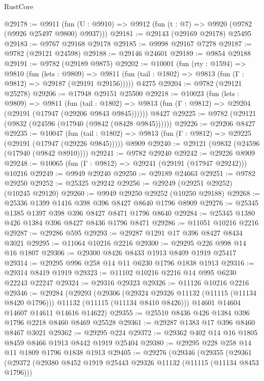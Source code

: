 \begin{lexlean}{RustCore}
\begin{coremodule}
@29178 := @9911
    (fun (U : @9910) => @9912 (fun (t : @7) => @9920 (@9782 (@9926 @25497 @9800) @9937)))
@29181 := @29143 (@29169 @29178) @25495
@29183 := @9767 @29168 @29178
@29185 := @9998 @29167 @7278
@29187 := @9782 (@29121 @24598)
@29188 := @29146 @24601
@29189 := @9854 @29188
@29191 := @9782 (@29189 @9875)
@29202 := @10001
    (fun (rty : @1594) =>
    @9810
      (fun (lets : @9809) =>
      @9811 (fun (tail : @1802) => @9813 (fun (Γ : @9812) => @29187 (@29191 @29156)))))
    @4275
@29204 := @9782 (@29121 @25278)
@29206 := @17948 @29151 @25500
@29218 := @10023
    (fun (lets : @9809) =>
    @9811
      (fun (tail : @1802) =>
      @9813 (fun (Γ : @9812) => @29204 (@29191 (@17947 (@29206 @9843 @9845))))))
    @8427
@29225 := @9782 (@29121 (@9832 (@24596 (@17940 (@9842 (@8428 @9845))))))
@29226 := @29206 @8427
@29235 := @10047
    (fun (tail : @1802) => @9813 (fun (Γ : @9812) => @29225 (@29191 (@17947 (@29226 @9845)))))
    @8909
@29240 := @29121 (@9832 (@24596 (@17940 (@9842 @8910))))
@29241 := @9782 @29240
@29242 := @29226 @8909
@29248 := @10065 (fun (Γ : @9812) => @29241 (@29191 (@17947 @29242))) @10216
@29249 := @9949 @29240
@29250 := @29189 @24663
@29251 := @9782 @29250
@29252 := @25325 @29242
@29256 := @29249 (@29251 @29252) (@10245 @29120)
@29260 := @9949 @29250 @29252 (@10250 @29188)
@29268 := @25336 @1399 @1416 @398 @396 @8427 @8640 @1796 @8909
@29276 := @25345 @1385 @1397 @398 @396 @8427 @8471 @1796 @8640
@29284 := @25345 @1380 @426 @1384 @396 @8427 @8436 @1796 @8471
@29286 := @11051 @10216 @2216
@29287 := @29286 @595
@29293 := @29287 @1291 @17 @396 @8427 @8434 @3021
@29295 := @11064 @10216 @2216
@29300 := @29295 @226 @998 @14 @16 @1807
@29306 := @29300 @8426 @8433 @1913 @8409 @1919 @25417
@29314 := @29295 @996 @258 @14 @11 @6230 @1796 @1838 @1913
@29316 := @29314 @8419 @1919
@29323 := @11102 @10216 @2216 @14 @995 @6230 @22243 @22247
@29324 := @29316 @29323
@29326 := @11126 @10216 @2216
@29346 := @29284
    (@29293
      (@29306
        (@29324 @29326 @11132 (@11115 (@11134 @8420 @1796)))
        @11132
        (@11115 (@11134 @8410 @8426)))
      @14601
      @14604
      @14607
      @14611
      @14616
      @14622)
@29355 := @25510 @8436 @426 @1384 @396 @1796 @2218 @8460 @8469 @25528
@29361 := @29287 @1383 @17 @396 @8460 @8467 @3021
@29362 := @29295 @224
@29372 := @29362 @402 @14 @16 @1805 @8459 @8466 @1913 @8442 @1919 @25404
@29380 := @29295 @228 @258 @14 @11 @1809 @1796 @1838 @1913
@29405 := @29276
    (@29346
      (@29355
        (@29361
          (@29372
            (@29380 @8452 @1919 @25443 @29326 @11132 (@11115 (@11134 @8453 @1796)))

\end{coremodule}
\end{lexlean}
